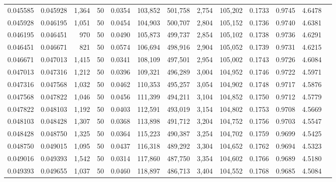 \begin{tabular}{rrrrrrrrrrrrr}
0.045585 & 0.045928 & 1,364 &  50 &                                     0.0354 & 103,852 & 501,758 &   2,754 & 105,202 & 0.1733 & 0.9745 & 4.6478 \\
0.045928 & 0.046195 & 1,051 &  50 &                                     0.0454 & 104,903 & 500,707 &   2,804 & 105,152 & 0.1736 & 0.9740 & 4.6381 \\
0.046195 & 0.046451 &   970 &  50 &                                     0.0490 & 105,873 & 499,737 &   2,854 & 105,102 & 0.1738 & 0.9736 & 4.6291 \\
0.046451 & 0.046671 &   821 &  50 &                                     0.0574 & 106,694 & 498,916 &   2,904 & 105,052 & 0.1739 & 0.9731 & 4.6215 \\
0.046671 & 0.047013 & 1,415 &  50 &                                     0.0341 & 108,109 & 497,501 &   2,954 & 105,002 & 0.1743 & 0.9726 & 4.6084 \\
0.047013 & 0.047316 & 1,212 &  50 &                                     0.0396 & 109,321 & 496,289 &   3,004 & 104,952 & 0.1746 & 0.9722 & 4.5971 \\
0.047316 & 0.047568 & 1,032 &  50 &                                     0.0462 & 110,353 & 495,257 &   3,054 & 104,902 & 0.1748 & 0.9717 & 4.5876 \\
0.047568 & 0.047822 & 1,046 &  50 &                                     0.0456 & 111,399 & 494,211 &   3,104 & 104,852 & 0.1750 & 0.9712 & 4.5779 \\
0.047822 & 0.048103 & 1,192 &  50 &                                     0.0403 & 112,591 & 493,019 &   3,154 & 104,802 & 0.1753 & 0.9708 & 4.5669 \\
0.048103 & 0.048428 & 1,307 &  50 &                                     0.0368 & 113,898 & 491,712 &   3,204 & 104,752 & 0.1756 & 0.9703 & 4.5547 \\
0.048428 & 0.048750 & 1,325 &  50 &                                     0.0364 & 115,223 & 490,387 &   3,254 & 104,702 & 0.1759 & 0.9699 & 4.5425 \\
0.048750 & 0.049015 & 1,095 &  50 &                                     0.0437 & 116,318 & 489,292 &   3,304 & 104,652 & 0.1762 & 0.9694 & 4.5323 \\
0.049016 & 0.049393 & 1,542 &  50 &                                     0.0314 & 117,860 & 487,750 &   3,354 & 104,602 & 0.1766 & 0.9689 & 4.5180 \\
0.049393 & 0.049655 & 1,037 &  50 &                                     0.0460 & 118,897 & 486,713 &   3,404 & 104,552 & 0.1768 & 0.9685 & 4.5084 \\

\end{tabular}
